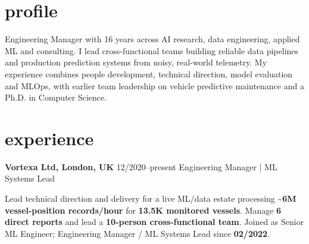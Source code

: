 \documentclass[]{../../../../friggeri-cv}
\renewcommand{\entry}[4]{%
  \parbox[t]{\dimexpr\textwidth-\entryleftinset\relax}{%
    \textbf{#2}%
    {\footnotesize\addfontfeature{Color=lightgray}\hspace{0.6em}#1}%
    \hfill%
    {\small\color{textcolor} #3}\\%
    #4\vspace{\parsep}%
  }\\}
\begin{document}
\section{profile}
{\normalsize Engineering Manager with 16 years across AI research, data engineering, applied ML and consulting. I lead cross-functional teams building reliable data pipelines and production prediction systems from noisy, real-world telemetry. My experience combines people development, technical direction, model evaluation and MLOps, with earlier team leadership on vehicle predictive maintenance and a Ph.D. in Computer Science.}
\section{experience}
\begin{entrylist}
    \entry
    {12/2020--present}
    {Vortexa Ltd, London, UK}
    {Engineering Manager | ML Systems Lead}
    {
        {\small
        \setlength{\parindent}{0pt}
        \setlength{\leftskip}{0pt}
        Lead technical direction and delivery for a live ML/data estate processing \textbf{\textasciitilde6M vessel-position records/hour} for \textbf{13.5K monitored vessels}. Manage \textbf{6 direct reports} and lead a \textbf{10-person cross-functional team}. Joined as Senior ML Engineer; Engineering Manager / ML Systems Lead since \textbf{02/2022}.

}}
\end{entrylist}
\end{document}
